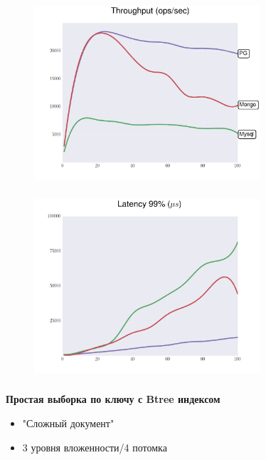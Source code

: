 \documentclass[18pt, compress, aspectratio=169]{beamer}
\begin{document}
\begin{frame}
    \frametitle{}
    \begin{center}
    \begin{figure}
        \includegraphics[width=0.75\textwidth,center]{benchmarks/workload_c_btree/throughput.png}
    \end{figure}
    \end{center}
\end{frame}

\begin{frame}
    \frametitle{}
    \begin{center}
    \begin{figure}
        \includegraphics[width=0.75\textwidth,center]{benchmarks/workload_c_btree/latency_99.png}
    \end{figure}
    \end{center}
\end{frame}

\begin{frame}
    \frametitle{}
    \begin{center}
        \textbf{Простая выборка по ключу с Btree индексом}
        \begin{itemize}[label={}]
            \item "Сложный документ"
            \item 3 уровня вложенности/4 потомка
        \end{itemize}
    \end{center}
\end{frame}
\end{document}

